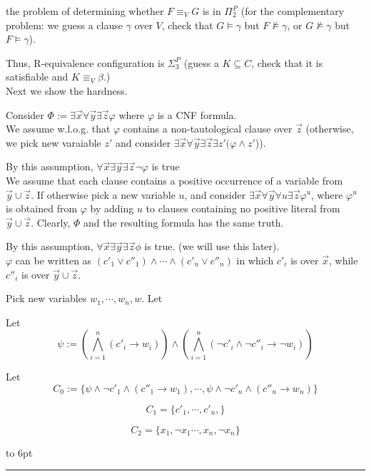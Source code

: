 \documentclass[12pt]{article}
\newenvironment{proof}{\parindent=0pt{\bf Proof: }}{
   \hspace*{\fill}\hbox to 6pt{\leaders\hrule width 6pt height 6pt\hfill}\par}
\begin{document}
\begin{proof}
the problem of determining whether $F\equiv_V G$  is in $\Pi_2^P$ (for the complementary problem: we guess a clause $\gamma$ over $V$, check that $G\models \gamma$ but $F\not\models \gamma$, or $G\not\models\gamma$ but $F\models\gamma$).

Thus, R-equivalence configuration is $\Sigma_3^P$ (guess a $K\subseteq C$, check that it is satisfiable and $K\equiv_V \beta$.) \\


Next we show the hardness.

Consider $\Phi:=\exists \vec{x}\forall\vec{y}\exists \vec{z} \varphi$ where $\varphi$ is a CNF formula. \\

We assume w.l.o.g. that $\varphi$ contains a non-tautological clause over $\vec{z}$ (otherwise, we pick new varaiable $z'$ and consider $\exists\vec{x}\forall\vec{y}\exists\vec{z}\exists z'(\varphi\wedge z'$)).

By this assumption, $\forall\vec{x}\exists\vec{y}\exists\vec{z}\neg \varphi$ is true\\

We assume that each clause contains a positive occurrence of a variable from $\vec{y}\cup\vec{z}$. If otherwise pick a new variable $u$, and consider $\exists \vec{x}\forall\vec{y}\forall u\exists \vec{z}\varphi^u$, where $\varphi^u$ is obtained from $\varphi$ by adding $u$ to clauses containing no positive literal from $\vec{y}\cup\vec{z}$. Clearly, $\Phi$ and the resulting formula has the same truth.

By this assumption, $\forall\vec{x}\exists\vec{y}\exists\vec{z}\phi$ is true. (we will use this later).\\

$\varphi$ can be written as $(c'_1\vee c''_1)\wedge\cdots\wedge (c'_n\vee c''_n)$ in which $c'_i$ is over $\vec{x}$, while $c''_i$ is over $\vec{y}\cup\vec{z}$.

Pick new variables $w_1, \cdots, w_n,w$. Let

Let $$\psi:= \left(\bigwedge_{i=1}^n (c'_i\rightarrow w_i)\right)\wedge
\left(\bigwedge_{i=1}^n(\neg c'_i\wedge \neg c''_i\rightarrow \neg w_i)\right)$$

Let $$C_0:=\{\psi\wedge \neg c'_1\wedge  (c''_1\rightarrow w_1) , \cdots, \psi\wedge\neg c'_n\wedge (c''_n\rightarrow w_n)\}$$

$$C_1=\{c'_1, \cdots, c'_n, \}$$

$$C_2=\{x_1,\neg x_1\cdots, x_n,\neg x_n\}$$


\end{proof}
\end{document}
